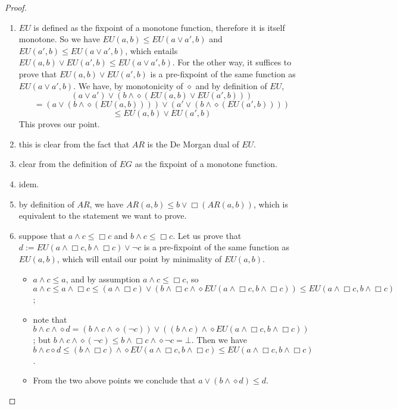 \documentclass[11pt]{article}
\begin{document}
\begin{proof}
    \begin{enumerate}
        \item $EU$ is defined as the fixpoint of a monotone function, therefore it is itself monotone. So we have $EU(a,b)\leq EU(a\vee a',b)$ and $EU(a',b)\leq EU(a\vee a',b)$, which entails $EU(a,b)\vee EU(a',b)\leq EU(a\vee a',b)$.
        For the other way, it suffices to prove that $EU(a,b)\vee EU(a',b)$ is a pre-fixpoint of the same function as $EU(a\vee a',b)$. We have, by monotonicity of $\diamond$ and by definition of $EU$, \[(a\vee a')\vee(b\wedge\diamond(EU(a,b)\vee EU(a',b)))\]\[=(a\vee(b\wedge\diamond(EU(a,b))))\vee (a'\vee(b\wedge\diamond(EU(a',b))))\]\[\leq EU(a,b)\vee EU(a',b)\]This proves our point.
        \item this is clear from the fact that $AR$ is the De Morgan dual of $EU$.
        \item clear from the definition of $EG$ as the fixpoint of a monotone function.
        \item idem.
        \item by definition of $AR$, we have $AR(a,b)\leq b\vee\Box(AR(a,b))$, which is equivalent to the statement we want to prove.
        \item suppose that $a\wedge c \leq \Box c$ and $b\wedge c \leq \Box c$. Let us prove that $d:=EU(a\wedge\Box c,b\wedge\Box c)\vee\neg c$ is a pre-fixpoint of the same function as $EU(a,b)$, which will entail our point by minimality of $EU(a,b)$.
        \begin{itemize}
            \item $a\wedge c\leq a$, and by assumption $a\wedge c\leq\Box c$, so $a\wedge c\leq a\wedge\Box c\leq (a\wedge\Box c)\vee(b\wedge\Box c\wedge\diamond EU(a\wedge\Box c,b\wedge\Box c))\leq EU(a\wedge\Box c,b\wedge\Box c)$;
            \item note that $b\wedge c\wedge \diamond d = (b\wedge c\wedge\diamond(\neg c))\vee((b\wedge c)\wedge\diamond EU(a\wedge\Box c,b\wedge\Box c))$; but $b\wedge c\wedge\diamond(\neg c)\leq b\wedge\Box c\wedge\diamond\neg c = \bot$. Then we have $b\wedge c\diamond d\leq (b\wedge\Box c)\wedge\diamond EU(a\wedge\Box c,b\wedge\Box c)\leq EU(a\wedge\Box c,b\wedge\Box c)$.
            \item From the two above points we conclude that $a\vee(b\wedge\diamond d)\leq d$. 
        \end{itemize}
    \end{enumerate}
\end{proof}
\end{document}
